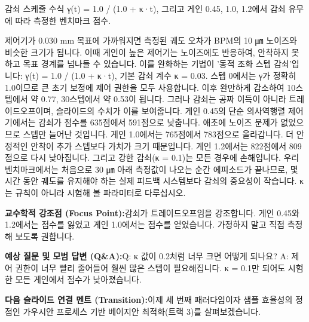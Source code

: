 \documentclass[11pt,a4paper]{article}
\begin{document}
\vspace{0.2em}
\begin{tcolorbox}[colback=lightbg,colframe=bordergray,title={\footnotesize\bfseries\color{darkgray}슬라이드 시각 구성 요약},fontupper=\small,left=6pt,right=6pt,top=2.5pt,bottom=2.5pt,boxrule=0.6pt,arc=2.5pt]
감쇠 스케줄 수식 γ(t) = 1.0 / (1.0 + κ·t), 그리고 게인 0.45, 1.0, 1.2에서 감쇠 유무에 따라 측정한 벤치마크 점수.
\end{tcolorbox}
\vspace{0.2em}
\begin{tcolorbox}[colback=white,colframe=primaryblue,title={\footnotesize\bfseries\color{white}발표자 구두 대본 (Spoken Script)},fontupper=\small,left=6pt,right=6pt,top=3pt,bottom=3pt,boxrule=0.8pt,arc=2.5pt]
제어기가 0.030 mm 목표에 가까워지면 측정된 궤도 오차가 BPM의 10 ㎛ 노이즈와 비슷한 크기가 됩니다. 이때 게인이 높은 제어기는 노이즈에도 반응하여, 안착하지 못하고 목표 경계를 넘나들 수 있습니다. 이를 완화하는 기법이 '동적 조화 스텝 감쇠'입니다: γ(t) = 1.0 / (1.0 + κ·t), 기본 감쇠 계수 κ = 0.03. 스텝 0에서는 γ가 정확히 1.0이므로 큰 초기 보정에 제어 권한을 모두 사용합니다. 이후 완만하게 감소하여 10스텝에서 약 0.77, 30스텝에서 약 0.53이 됩니다. 그러나 감쇠는 공짜 이득이 아니라 트레이드오프이며, 슬라이드의 수치가 이를 보여줍니다. 게인 0.45의 단순 의사역행렬 제어기에서는 감쇠가 점수를 635점에서 591점으로 낮춥니다. 애초에 노이즈 문제가 없었으므로 스텝만 늘어난 것입니다. 게인 1.0에서는 765점에서 783점으로 올라갑니다. 더 안정적인 안착이 추가 스텝보다 가치가 크기 때문입니다. 게인 1.2에서는 822점에서 809점으로 다시 낮아집니다. 그리고 강한 감쇠(κ = 0.1)는 모든 경우에 손해입니다. 우리 벤치마크에서는 처음으로 30 ㎛ 아래 측정값이 나오는 순간 에피소드가 끝나므로, 몇 시간 동안 궤도를 유지해야 하는 실제 피드백 시스템보다 감쇠의 중요성이 작습니다. κ는 규칙이 아니라 시험해 볼 파라미터로 다루십시오.
\end{tcolorbox}
\vspace{0.2em}
\begin{tcolorbox}[colback=lightbg,colframe=bordergray,left=6pt,right=6pt,top=3pt,bottom=3pt,boxrule=0.6pt,arc=2.5pt]
\small
\noindent\textbf{\color{navy}교수학적 강조점 (Focus Point):}\enspace 감쇠가 트레이드오프임을 강조합니다. 게인 0.45와 1.2에서는 점수를 잃었고 게인 1.0에서는 점수를 얻었습니다. 가정하지 말고 직접 측정해 보도록 권합니다.\par\vspace{0.3em}
\noindent\textbf{\color{successgreen}예상 질문 및 모범 답변 (Q\&A):}\enspace Q: κ 값이 0.2처럼 너무 크면 어떻게 되나요? A: 제어 권한이 너무 빨리 줄어들어 훨씬 많은 스텝이 필요해집니다. κ = 0.1만 되어도 시험한 모든 게인에서 점수가 낮아졌습니다.\par\vspace{0.3em}
\noindent\textbf{\color{accent}다음 슬라이드 연결 멘트 (Transition):}\enspace 이제 세 번째 패러다임이자 샘플 효율성의 정점인 가우시안 프로세스 기반 베이지안 최적화(트랙 3)를 살펴보겠습니다.
\end{tcolorbox}
\end{document}
